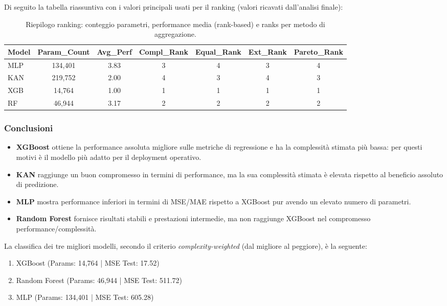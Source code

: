 \documentclass[a4paper,12pt]{report}
\begin{document}
	Di seguito la tabella riassuntiva con i valori principali usati per il ranking (valori ricavati dall'analisi finale):
	
	\begin{table}[H]
		\centering
		\setlength{\tabcolsep}{2pt}
		\small
		\begin{tabular}{lcccccc}
			\toprule
			\textbf{Model} & \textbf{Param\_Count} & \textbf{Avg\_Perf} & \textbf{Compl\_Rank} & \textbf{Equal\_Rank} & \textbf{Ext\_Rank} & \textbf{Pareto\_Rank} \\
			\midrule
			MLP           & 134,401 & 3.83 & 3 & 4 & 3 & 4 \\
			KAN           & 219,752 & 2.00 & 4 & 3 & 4 & 3 \\
			XGB 		  & 14,764  & 1.00 & 1 & 1 & 1 & 1 \\
			RF 			  & 46,944  & 3.17 & 2 & 2 & 2 & 2 \\
			\bottomrule
		\end{tabular}
		\caption{Riepilogo ranking: conteggio parametri, performance media (rank-based) e ranks per metodo di aggregazione.}
	\end{table}
	
	\subsubsection{Conclusioni}
	\begin{itemize}
		\item \textbf{XGBoost} ottiene la performance assoluta migliore sulle metriche di regressione e ha la complessità stimata più bassa: per questi motivi è il modello più adatto per il deployment operativo.
		\item \textbf{KAN} raggiunge un buon compromesso in termini di performance, ma la sua complessità stimata è elevata rispetto al beneficio assoluto di predizione.
		\item \textbf{MLP} mostra performance inferiori in termini di MSE/MAE rispetto a XGBoost pur avendo un elevato numero di parametri.
		\item \textbf{Random Forest} fornisce risultati stabili e prestazioni intermedie, ma non raggiunge XGBoost nel compromesso performance/complessità.
	\end{itemize}
	
	La classifica dei tre migliori modelli, secondo il criterio \emph{complexity-weighted} (dal migliore al peggiore), è la seguente:
	\begin{enumerate}
		\item XGBoost \quad (Params: 14{,}764 \;|\; MSE Test: 17.52)
		\item Random Forest \quad (Params: 46{,}944 \;|\; MSE Test: 511.72)
		\item MLP \quad (Params: 134{,}401 \;|\; MSE Test: 605.28)
	\end{enumerate}
	
\end{document}
